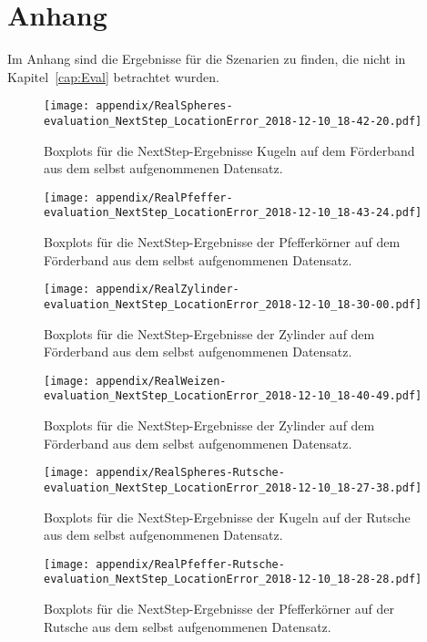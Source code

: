 \chapter{Anhang}
\label{cap:appendix}

Im Anhang sind die Ergebnisse für die Szenarien zu finden, die nicht in Kapitel~\ref{cap:Eval} betrachtet wurden.

\begin{figure}[h]
    \centering
	\texttt{[image: appendix/RealSpheres-evaluation\_NextStep\_LocationError\_2018-12-10\_18-42-20.pdf]}
    \caption{Boxplots für die NextStep-Ergebnisse Kugeln auf dem Förderband aus dem selbst aufgenommenen Datensatz.}
\end{figure}

\begin{figure}[h]
    \centering
	\texttt{[image: appendix/RealPfeffer-evaluation\_NextStep\_LocationError\_2018-12-10\_18-43-24.pdf]}
    \caption{Boxplots für die NextStep-Ergebnisse der Pfefferkörner auf dem Förderband aus dem selbst aufgenommenen Datensatz.}
\end{figure}

\begin{figure}[h]
    \centering
	\texttt{[image: appendix/RealZylinder-evaluation\_NextStep\_LocationError\_2018-12-10\_18-30-00.pdf]}
    \caption{Boxplots für die NextStep-Ergebnisse der Zylinder auf dem Förderband aus dem selbst aufgenommenen Datensatz.}
\end{figure}

\begin{figure}[h]
    \centering
	\texttt{[image: appendix/RealWeizen-evaluation\_NextStep\_LocationError\_2018-12-10\_18-40-49.pdf]}
    \caption{Boxplots für die NextStep-Ergebnisse der Zylinder auf dem Förderband aus dem selbst aufgenommenen Datensatz.}
\end{figure}

\begin{figure}[h]
    \centering
	\texttt{[image: appendix/RealSpheres-Rutsche-evaluation\_NextStep\_LocationError\_2018-12-10\_18-27-38.pdf]}
    \caption{Boxplots für die NextStep-Ergebnisse der Kugeln auf der Rutsche aus dem selbst aufgenommenen Datensatz.}
\end{figure}

\begin{figure}[h]
    \centering
	\texttt{[image: appendix/RealPfeffer-Rutsche-evaluation\_NextStep\_LocationError\_2018-12-10\_18-28-28.pdf]}
    \caption{Boxplots für die NextStep-Ergebnisse der Pfefferkörner auf der Rutsche aus dem selbst aufgenommenen Datensatz.}
\end{figure}


